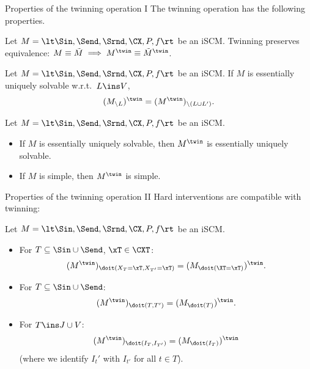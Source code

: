 \begin{frame}{Properties of the twinning operation I}
The twinning operation has the following properties.

Let $M = \lt \Sin, \Send, \Srnd, \CX, P, f \rt$ be an iSCM.
Twinning preserves equivalence: $M \equiv \tilde{M} \implies M^\twin \equiv \tilde{M}^\twin$.
  \begin{Prp}[\ref{prp:twinning_marginalization_commute}]
Let $M = \lt \Sin, \Send, \Srnd, \CX, P, f \rt$ be an iSCM.
  If $M$ is essentially uniquely solvable w.r.t.\ $L \ins V$,
  $$(M_{\setminus L})^\twin = (M^\twin)_{\setminus (L\cup L')}.$$
  \end{Prp}
  \begin{Cor}[\ref{prp:twin_scm_simple}]
  Let $M = \lt \Sin, \Send, \Srnd, \CX, P, f \rt$ be an iSCM.
    \begin{itemize}
      \item If $M$ is essentially uniquely solvable, then $M^\twin$ is essentially uniquely solvable.
      \item If $M$ is simple, then $M^\twin$ is simple.
    \end{itemize}
  \end{Cor}
\end{frame}

\begin{frame}{Properties of the twinning operation II}
Hard interventions are compatible with twinning:
\begin{Prp}[\ref{prp:hard_interventions_twin_scm}]
Let $M = \lt \Sin, \Send, \Srnd, \CX, P, f \rt$ be an iSCM.
\begin{itemize}
  \item For $T \subseteq \Sin \cup \Send$, $\xT \in \CXT$:
    $$(M^\twin)_{\doit(X_T=\xT,X_{T'}=\xT)} = (M_{\doit(\XT=\xT)})^\twin.$$
  \item For $T \subseteq \Sin \cup \Send$:
    $$(M^\twin)_{\doit(T,T')} = (M_{\doit(T)})^\twin.$$
  \item For $T \ins J \cup V$:
    $$(M^\twin)_{\doit(I_T,I_{T'})} = (M_{\doit(I_T)})^\twin$$
    (where we identify $I_t'$ with $I_{t'}$ for all $t \in T$). 
\end{itemize}
\end{Prp}
\end{frame}

